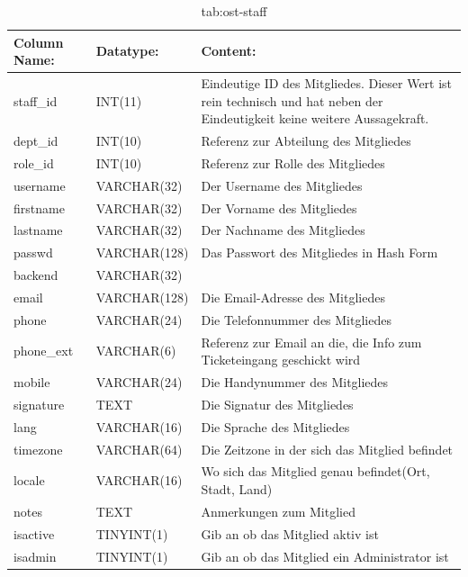 \begin{table}[h]
	\begin{tabular}{|p{3.5cm}|p{4cm}|p{6.2cm}|}
		\hline
		\textbf{Column Name:} & \textbf{Datatype:} & \textbf{Content:}\\
		\hline
		staff\_id & INT(11) & Eindeutige ID des Mitgliedes. Dieser Wert ist rein technisch und hat neben der Eindeutigkeit keine weitere 
		Aussagekraft.\\
		\hline
		dept\_id & INT(10) & Referenz zur Abteilung des Mitgliedes \\
		\hline
		role\_id & INT(10) & Referenz zur Rolle des Mitgliedes\\
		\hline
		username & VARCHAR(32) & Der Username des Mitgliedes\\
		\hline
		firstname & VARCHAR(32) & Der Vorname des Mitgliedes\\
		\hline
		lastname & VARCHAR(32) &  Der Nachname des Mitgliedes\\
		\hline
		passwd & VARCHAR(128) & Das Passwort des Mitgliedes in Hash Form \\
		\hline
		backend & VARCHAR(32) & \\
		\hline
		email & VARCHAR(128) & Die Email-Adresse des Mitgliedes \\
		\hline
		phone & VARCHAR(24) & Die Telefonnummer des Mitgliedes \\
		\hline
		phone\_ext & VARCHAR(6) & Referenz zur Email an die, die Info zum Ticketeingang geschickt wird \\
		\hline
		mobile & VARCHAR(24) & Die Handynummer des Mitgliedes \\
		\hline
		signature & TEXT & Die Signatur des Mitgliedes \\
		\hline
		lang & VARCHAR(16) & Die Sprache des Mitgliedes \\
		\hline
		timezone & VARCHAR(64) & Die Zeitzone in der sich das Mitglied befindet \\
		\hline
		locale & VARCHAR(16)& Wo sich das Mitglied genau befindet(Ort, Stadt, Land) \\
		\hline
		notes & TEXT & Anmerkungen zum Mitglied\\
		\hline
		isactive & TINYINT(1) & Gib an ob das Mitglied aktiv ist\\
		\hline
		isadmin & TINYINT(1) & Gib an ob das Mitglied ein Administrator ist\\
		\hline
			\end{tabular}
			\caption{tab:ost-staff}
		\end{table}
